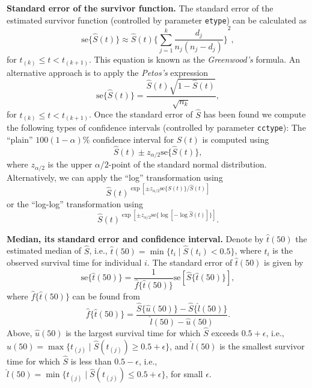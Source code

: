 \textbf{Standard error of the survivor function.}
The standard error of the estimated survivor function (controlled by parameter {\tt etype}) can be calculated as  
\begin{equation*}
\text{se} \{\hat{S}(t)\} \approx \hat{S}(t) {\bigg\{ \sum_{j=1}^{k} \frac{d_j}{n_j(n_j -   d_j)}\biggr\}}^2,
\end{equation*}
for $t_{(k)}\leq t<t_{(k+1)}$.
This equation is known as the {\it Greenwood's} formula.
An alternative approach is to apply the {\it Petos's} expression %
\begin{equation*}
\text{se}\{\hat{S}(t)\}=\frac{\hat{S}(t)\sqrt{1-\hat{S}(t)}}{\sqrt{n_k}},
\end{equation*}
for $t_{(k)}\leq t<t_{(k+1)}$. 
Once the standard error of $\hat{S}$ has been found we compute the following types of confidence intervals (controlled by parameter {\tt cctype}): 
The ``plain'' $100(1-\alpha)\%$ confidence interval for $S(t)$ is computed using 
\begin{equation*}
\hat{S}(t)\pm z_{\alpha/2} \text{se}\{\hat{S}(t)\}, 
\end{equation*} 
where $z_{\alpha/2}$ is the upper $\alpha/2$-point of the standard normal distribution. 
Alternatively, we can apply the ``log'' transformation using 
\begin{equation*}
\hat{S}(t)^{\exp[\pm z_{\alpha/2} \text{se}\{\hat{S}(t)\}/\hat{S}(t)]}
\end{equation*}
or the ``log-log'' transformation using 
\begin{equation*}
\hat{S}(t)^{\exp [\pm z_{\alpha/2} \text{se} \{\log [-\log \hat{S}(t)]\}]}.
\end{equation*}

\textbf{Median, its standard error and confidence interval.}
Denote by $\hat{t}(50)$ the estimated median of $\hat{S}$, i.e.,
$\hat{t}(50)=\min \{ t_i \mid \hat{S}(t_i) < 0.5\}$,
where $t_i$ is the observed survival time for individual $i$.
The standard error of $\hat{t}(50)$ is given by
\begin{equation*}
\text{se}\{ \hat{t}(50) \} = \frac{1}{\hat{f}\{\hat{t}(50)\}} \text{se}[\hat{S}\{ \hat{t}(50) \}],
\end{equation*}
where $\hat{f}\{ \hat{t}(50) \}$ can be found from
\begin{equation*}
\hat{f}\{ \hat{t}(50) \} = \frac{\hat{S}\{ \hat{u}(50) \} -\hat{S}\{ \hat{l}(50) \} }{\hat{l}(50) - \hat{u}(50)}. 
\end{equation*}
Above, $\hat{u}(50)$ is the largest survival time for which $\hat{S}$ exceeds $0.5+\epsilon$, i.e., $\hat{u}(50)=\max \bigl\{ t_{(j)} \mid \hat{S}(t_{(j)}) \geq 0.5+\epsilon \bigr\}$,
and $\hat{l}(50)$ is the smallest survivor time for which $\hat{S}$ is less than $0.5-\epsilon$,
i.e., $\hat{l}(50)=\min \bigl\{ t_{(j)} \mid \hat{S}(t_{(j)}) \leq 0.5+\epsilon \bigr\}$,
for small $\epsilon$.


